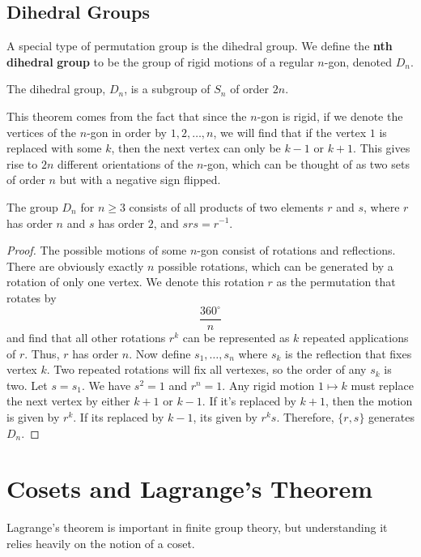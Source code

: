\documentclass[12pt, letterpaper]{report}
\begin{document}
\section{Dihedral Groups}
A special type of permutation group is the dihedral group. We define the \textbf{nth} \textbf{dihedral} \textbf{group} to be the group of rigid motions of a regular \(n\)-gon, denoted \(D_n\).
\begin{theorem}
	The dihedral group, \(D_n\), is a subgroup of \(S_n\) of order \(2n\).
\end{theorem}
This theorem comes from the fact that since the \(n\)-gon is rigid, if we denote the vertices of the \(n\)-gon in order by \(1,2,\ldots,n\), we will find that if the vertex \(1\) is replaced with some \(k\), then the next vertex can only be \(k-1\) or \(k+1\). This gives rise to \(2n\) different orientations of the \(n\)-gon, which can be thought of as two sets of order \(n\) but with a negative sign flipped.
\begin{theorem}
	The group \(D_n\) for \(n\geq 3\) consists of all products of two elements \(r\) and \(s\), where \(r\) has order \(n\) and \(s\) has order \(2\), and \(srs=r^{-1} \).
\end{theorem}
\begin{proof}
	The possible motions of some \(n\)-gon consist of rotations and reflections. There are obviously exactly \(n\) possible rotations, which can be generated by a rotation of only one vertex. We denote this rotation \(r\) as the permutation that rotates by
	\[
		\frac{360^{\circ } }{n}
	\]
	and find that all other rotations \(r^k\) can be represented as \(k\) repeated applications of \(r\). Thus, \(r\) has order \(n\). Now define \(s_1,\ldots,s_n\) where \(s_k\) is the reflection that fixes vertex \(k\). Two repeated rotations will fix all vertexes, so the order of any \(s_k\) is two. Let \(s=s_1\). We have \(s^2 =1\) and \(r^n =1\). Any rigid motion \(1\mapsto k\) must replace the next vertex by either \(k+1\) or \(k-1\). If it's replaced by \(k+1\), then the motion is given by \(r^k\). If its replaced by \(k-1\), its given by \(r^k s\). Therefore, \(\{ r,s \} \) generates \(D_n\). 
\end{proof}
\chapter{Cosets and Lagrange's Theorem}
Lagrange's theorem is important in finite group theory, but understanding it relies heavily on the notion of a coset. 
\end{document}
